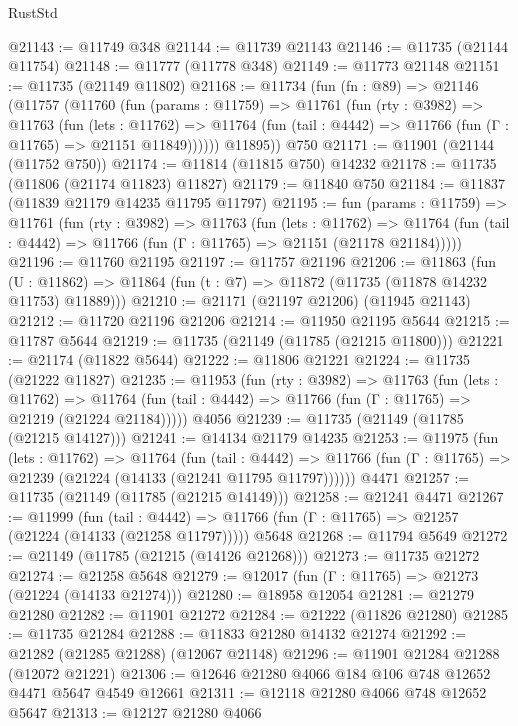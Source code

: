 \begin{lexlean}{RustStd}
\begin{coremodule}
@21143 := @11749 @348
@21144 := @11739 @21143
@21146 := @11735 (@21144 @11754)
@21148 := @11777 (@11778 @348)
@21149 := @11773 @21148
@21151 := @11735 (@21149 @11802)
@21168 := @11734
    (fun (fn : @89) =>
    @21146
      (@11757
        (@11760
          (fun (params : @11759) =>
          @11761
            (fun (rty : @3982) =>
            @11763
              (fun (lets : @11762) =>
              @11764 (fun (tail : @4442) => @11766 (fun (Γ : @11765) => @21151 @11849))))))
        @11895))
    @750
@21171 := @11901 (@21144 (@11752 @750))
@21174 := @11814 (@11815 @750) @14232
@21178 := @11735 (@11806 (@21174 @11823) @11827)
@21179 := @11840 @750
@21184 := @11837 (@11839 @21179 @14235 @11795 @11797)
@21195 := fun (params : @11759) =>
  @11761
    (fun (rty : @3982) =>
    @11763
      (fun (lets : @11762) =>
      @11764 (fun (tail : @4442) => @11766 (fun (Γ : @11765) => @21151 (@21178 @21184)))))
@21196 := @11760 @21195
@21197 := @11757 @21196
@21206 := @11863
    (fun (U : @11862) => @11864 (fun (t : @7) => @11872 (@11735 (@11878 @14232 @11753) @11889)))
@21210 := @21171 (@21197 @21206) (@11945 @21143)
@21212 := @11720 @21196 @21206
@21214 := @11950 @21195 @5644
@21215 := @11787 @5644
@21219 := @11735 (@21149 (@11785 (@21215 @11800)))
@21221 := @21174 (@11822 @5644)
@21222 := @11806 @21221
@21224 := @11735 (@21222 @11827)
@21235 := @11953
    (fun (rty : @3982) =>
    @11763
      (fun (lets : @11762) =>
      @11764 (fun (tail : @4442) => @11766 (fun (Γ : @11765) => @21219 (@21224 @21184)))))
    @4056
@21239 := @11735 (@21149 (@11785 (@21215 @14127)))
@21241 := @14134 @21179 @14235
@21253 := @11975
    (fun (lets : @11762) =>
    @11764
      (fun (tail : @4442) =>
      @11766 (fun (Γ : @11765) => @21239 (@21224 (@14133 (@21241 @11795 @11797))))))
    @4471
@21257 := @11735 (@21149 (@11785 (@21215 @14149)))
@21258 := @21241 @4471
@21267 := @11999
    (fun (tail : @4442) => @11766 (fun (Γ : @11765) => @21257 (@21224 (@14133 (@21258 @11797)))))
    @5648
@21268 := @11794 @5649
@21272 := @21149 (@11785 (@21215 (@14126 @21268)))
@21273 := @11735 @21272
@21274 := @21258 @5648
@21279 := @12017 (fun (Γ : @11765) => @21273 (@21224 (@14133 @21274)))
@21280 := @18958 @12054
@21281 := @21279 @21280
@21282 := @11901 @21272
@21284 := @21222 (@11826 @21280)
@21285 := @11735 @21284
@21288 := @11833 @21280 @14132 @21274
@21292 := @21282 (@21285 @21288) (@12067 @21148)
@21296 := @11901 @21284 @21288 (@12072 @21221)
@21306 := @12646 @21280 @4066 @184 @106 @748 @12652 @4471 @5647 @4549 @12661
@21311 := @12118 @21280 @4066 @748 @12652 @5647
@21313 := @12127 @21280 @4066

\end{coremodule}
\end{lexlean}
